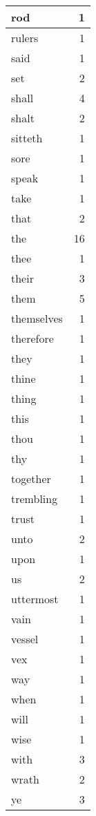 \begin{center}
\begin{longtable}{l|r}
rod & 1 \\ \hline
rulers & 1 \\ \hline
said & 1 \\ \hline
set & 2 \\ \hline
shall & 4 \\ \hline
shalt & 2 \\ \hline
sitteth & 1 \\ \hline
sore & 1 \\ \hline
speak & 1 \\ \hline
take & 1 \\ \hline
that & 2 \\ \hline
the & 16 \\ \hline
thee & 1 \\ \hline
their & 3 \\ \hline
them & 5 \\ \hline
themselves & 1 \\ \hline
therefore & 1 \\ \hline
they & 1 \\ \hline
thine & 1 \\ \hline
thing & 1 \\ \hline
this & 1 \\ \hline
thou & 1 \\ \hline
thy & 1 \\ \hline
together & 1 \\ \hline
trembling & 1 \\ \hline
trust & 1 \\ \hline
unto & 2 \\ \hline
upon & 1 \\ \hline
us & 2 \\ \hline
uttermost & 1 \\ \hline
vain & 1 \\ \hline
vessel & 1 \\ \hline
vex & 1 \\ \hline
way & 1 \\ \hline
when & 1 \\ \hline
will & 1 \\ \hline
wise & 1 \\ \hline
with & 3 \\ \hline
wrath & 2 \\ \hline
ye & 3 \\ \hline
\end{longtable}
\end{center}



\normalsize



